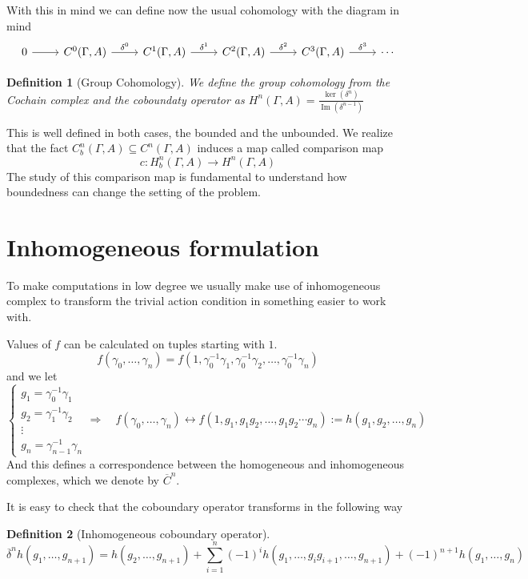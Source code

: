 \documentclass[leqno]{article}
\DeclareMathOperator{\im}{Im}
\newtheorem*{definition}{Definition}
\begin{document}
With this in mind we can define now the usual cohomology with the diagram in mind
\[\begin{tikzcd}
	0 & {C^0(\Gamma, A)} & {C^1(\Gamma, A)} & {C^2(\Gamma, A)} & {C^3(\Gamma, A)} & \cdots
	\arrow[from=1-1, to=1-2]
	\arrow["{\delta^0}", from=1-2, to=1-3]
	\arrow["{\delta^1}", from=1-3, to=1-4]
	\arrow["{\delta^2}", from=1-4, to=1-5]
	\arrow["{\delta^3}", from=1-5, to=1-6]
\end{tikzcd}\]

\begin{definition}[Group Cohomology] We define the group cohomology from the Cochain complex and the coboundaty operator as $\displaystyle H^n(\Gamma , A) = \frac{\ker(\delta^n)}{\im(\delta^{n-1})}$
\end{definition}

This is well defined in both cases, the bounded and the unbounded. We realize that the fact $C_b^n(\Gamma , A)\subseteq C^n(\Gamma , A)$ induces a map called comparison map
\[
c: H_b^n(\Gamma , A) \to  H^n(\Gamma , A)
\] 
The study of this comparison map is fundamental to understand how boundedness can change the setting of the problem.

\section{Inhomogeneous formulation}
To make computations in low degree we usually make use of inhomogeneous complex to transform the trivial action condition in something easier to work with.

Values of $f$ can be calculated on tuples starting with $1$.
 \[
f(\gamma_0, \ldots, \gamma_n) = f(1, \gamma_0^{-1}\gamma_1, \gamma_0^{-1}\gamma_2, \ldots, \gamma_0^{-1} \gamma_n)
\] 
and we let
\[
\begin{cases}
 g_1 = \gamma_0^{-1}\gamma_1\\
 g_2 = \gamma_1^{-1}\gamma_2\\
 \vdots\\
 g_n = \gamma_{n-1}^{-1} \gamma_n
\end{cases}
\Rightarrow \quad
f(\gamma_0, \ldots, \gamma_n) 
\leftrightarrow f(1, g_1, g_1g_2, \ldots, g_1g_2\cdots g_n) := h(g_1, g_2, \ldots, g_n)
\] 
And this defines a correspondence between the homogeneous and inhomogeneous complexes, which we denote by $\overline{C}^n$.

It is easy to check that the coboundary operator transforms in the following way 
\begin{definition}[Inhomogeneous coboundary operator]
  \[
	\overline{\delta}^nh(g_1, \ldots, g_{n+1}) = h(g_2, \ldots, g_{n+1}) + \sum_{i=1}^n (-1)^ih(g_1, \ldots, g_ig_{i+1}, \ldots, g_{n+1}) + (-1)^{n+1}h(g_1, \ldots, g_n)
  \] 
\end{definition}
\end{document}

